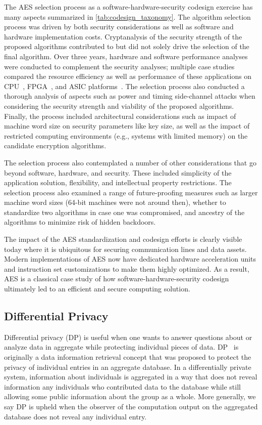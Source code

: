 The AES selection process as a software-hardware-security codesign exercise has many aspects summarized in \autoref{tab:codesign_taxonomy}.
The algorithm selection process was driven by both security considerations as well as software and hardware implementation costs.
Cryptanalysis of the security strength of the proposed algorithms contributed to but did not solely drive the selection of the final algorithm.
Over three years, hardware and software performance analyses were conducted to complement the security analyses; multiple case studies compared the resource efficiency as well as performance of these applications on CPU~\cite{aes_cpu_comparison}, FPGA~\cite{aes_fpga_comparison}, and ASIC platforms~\cite{aes_asic_comparison}.
The selection process also conducted a thorough analysis of aspects such as power and timing side-channel attacks when considering the security strength and viability of the proposed algorithms.
Finally, the process included architectural considerations such as impact of machine word size on security parameters like key size, as well as the impact of restricted computing environments (e.g., systems with limited memory) on the candidate encryption algorithms.

The selection process also contemplated a number of other considerations that go beyond software, hardware, and security.
These included simplicity of the application solution, flexibility, and intellectual property restrictions.
The selection process also examined a range of future-proofing measures such as larger machine word sizes (64-bit machines were not around then), whether to standardize two algorithms in case one was compromised, and ancestry of the algorithms to minimize risk of hidden backdoors.

The impact of the AES standardization and codesign efforts is clearly visible today where it is ubiquitous for securing communication lines and data assets.
Modern implementations of AES now have dedicated hardware acceleration units and instruction set customizations to make them highly optimized.
As a result, AES is a classical case study of how software-hardware-security codesign ultimately led to an efficient and secure computing solution.

\subsection{Differential Privacy}

Differential privacy (DP) is useful when one wants to answer questions about or analyze data in aggregate while protecting individual pieces of data.
DP~\cite{dwork2008differential} is originally a data information retrieval concept that was proposed to protect the privacy of individual entries in an aggregate database.
In a differentially private system, information about individuals is aggregated in a way that does not reveal information any individuals who contributed data to the database while still allowing some public information about the group as a whole.
More generally, we say DP is upheld when the observer of the computation output on the aggregated database does not reveal any individual entry.

